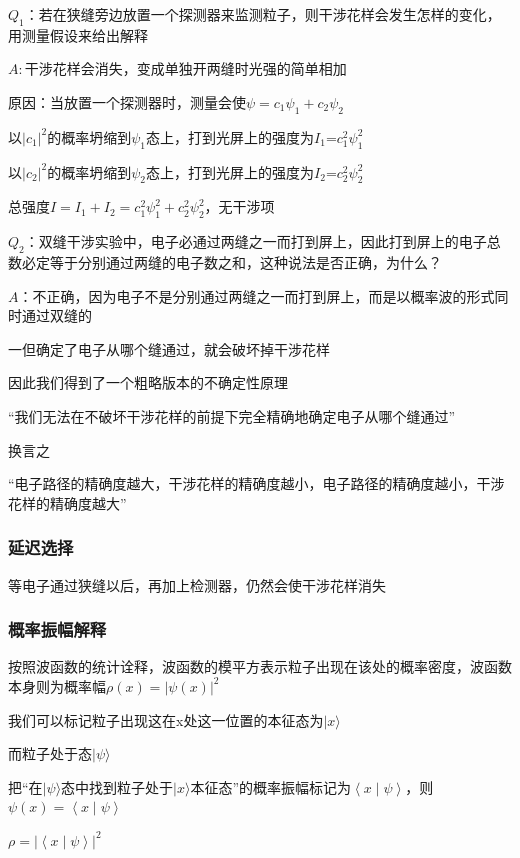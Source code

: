 \documentclass[lang=cn,10pt]{elegantbook}
\begin{document}
$Q_1$：若在狭缝旁边放置一个探测器来监测粒子，则干涉花样会发生怎样的变化，用测量假设来给出解释

$A:$干涉花样会消失，变成单独开两缝时光强的简单相加

原因：当放置一个探测器时，测量会使$\psi=c_1\psi_1+c_2\psi_2$

以$|c_1|^2$的概率坍缩到$\psi_1$态上，打到光屏上的强度为$I_1$=$c_1^{2}\psi_1^{2}$

以$|c_2|^2$的概率坍缩到$\psi_2$态上，打到光屏上的强度为$I_2$=$c_2^{2}\psi_2^{2}$

总强度$I=I_1+I_2=c_1^{2}\psi_1^{2}+c_2^{2}\psi_2^{2}$，无干涉项


$Q_2$：双缝干涉实验中，电子必通过两缝之一而打到屏上，因此打到屏上的电子总数必定等于分别通过两缝的电子数之和，这种说法是否正确，为什么？

$A$：不正确，因为电子不是分别通过两缝之一而打到屏上，而是以概率波的形式同时通过双缝的

一但确定了电子从哪个缝通过，就会破坏掉干涉花样

因此我们得到了一个粗略版本的不确定性原理

“我们无法在不破坏干涉花样的前提下完全精确地确定电子从哪个缝通过”

换言之

“电子路径的精确度越大，干涉花样的精确度越小，电子路径的精确度越小，干涉花样的精确度越大”

\subsubsection{延迟选择}

等电子通过狭缝以后，再加上检测器，仍然会使干涉花样消失

\subsubsection{概率振幅解释}
按照波函数的统计诠释，波函数的模平方表示粒子出现在该处的概率密度，波函数本身则为概率幅$\rho(x)=|\psi(x)|^2$

我们可以标记粒子出现这在x处这一位置的本征态为$|x\rangle $

而粒子处于态$|\psi\rangle $

把“在$|\psi\rangle $态中找到粒子处于$|x\rangle $本征态”的概率振幅标记为$\left< x \middle| \psi \right> $，则$\psi(x)=\left< x \middle| \psi \right>$

$\rho=|\left< x \middle| \psi \right> |^2$
\end{document}
